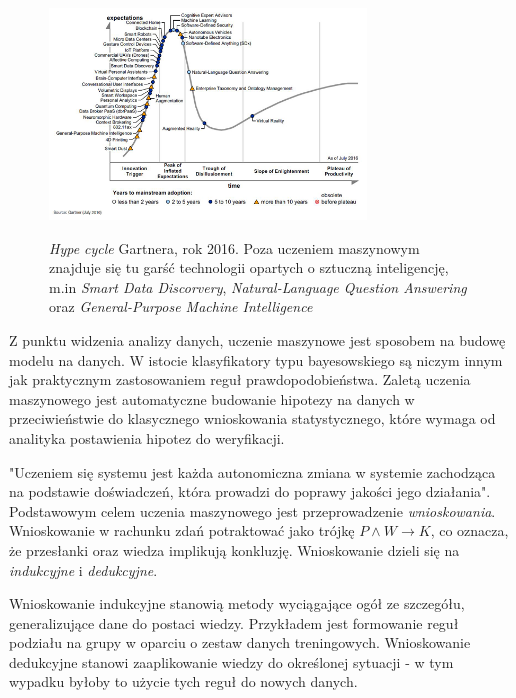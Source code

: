 \documentclass[12pt,a4paper,oneside]{report} %
\begin{document}
\begin{figure}
\centering
\includegraphics[width=0.75\textwidth]{gartner.png}
\label{gartner}
\caption{\emph{Hype cycle} Gartnera, rok 2016. Poza uczeniem maszynowym znajduje się tu garść technologii opartych o sztuczną inteligencję, m.in \emph{Smart Data Discorvery}, \emph{Natural-Language Question Answering} oraz \emph{General-Purpose Machine Intelligence}}
\end{figure}

Z punktu widzenia analizy danych, uczenie maszynowe jest sposobem na budowę modelu na danych. W istocie klasyfikatory typu bayesowskiego są niczym innym jak praktycznym zastosowaniem reguł prawdopodobieństwa. Zaletą uczenia maszynowego jest automatyczne budowanie hipotezy na danych w przeciwieństwie do klasycznego wnioskowania statystycznego, które wymaga od analityka postawienia hipotez do weryfikacji. \par

"Uczeniem się systemu jest każda autonomiczna zmiana w systemie zachodząca na podstawie doświadczeń, która prowadzi do poprawy jakości jego działania"\cite{cichosz}. Podstawowym celem uczenia maszynowego jest przeprowadzenie \emph{wnioskowania}. Wnioskowanie w rachunku zdań potraktować jako trójkę $ P \wedge W \rightarrow K $, co oznacza, że przesłanki oraz wiedza implikują konkluzję. Wnioskowanie dzieli się na \emph{indukcyjne} i \emph{dedukcyjne}. \par

Wnioskowanie indukcyjne stanowią metody wyciągające ogół ze szczegółu, generalizujące dane do postaci wiedzy. Przykładem jest formowanie reguł podziału na grupy w oparciu o zestaw danych treningowych. Wnioskowanie dedukcyjne stanowi zaaplikowanie wiedzy do określonej sytuacji - w tym wypadku byłoby to użycie tych reguł do nowych danych. \par
\end{document}
